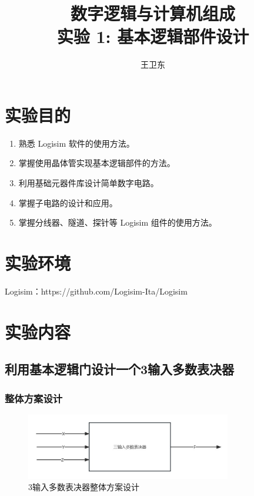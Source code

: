 \documentclass{article}
\title{数字逻辑与计算机组成\\ {\small 实验 1: 基本逻辑部件设计}}
\author{王卫东\quad 221900332}
\date{\zhtoday}
\begin{document}
    \maketitle

    \section{实验目的}

    \begin{enumerate}
        \item 熟悉 Logisim 软件的使用方法。
        \item 掌握使用晶体管实现基本逻辑部件的方法。
        \item 利用基础元器件库设计简单数字电路。
        \item 掌握子电路的设计和应用。
        \item 掌握分线器、隧道、探针等 Logisim 组件的使用方法。
    \end{enumerate}

    \section{实验环境}

    Logisim：https://github.com/Logisim-Ita/Logisim

    \section{实验内容}
    
    \subsection{利用基本逻辑门设计一个3输入多数表决器}

    \subsubsection{整体方案设计}
    \begin{figure}[H]
    \centering
    \includegraphics[width=0.8\textwidth]{1.1.jpg}
    \caption{3输入多数表决器整体方案设计}
    \end{figure}
\end{document}
